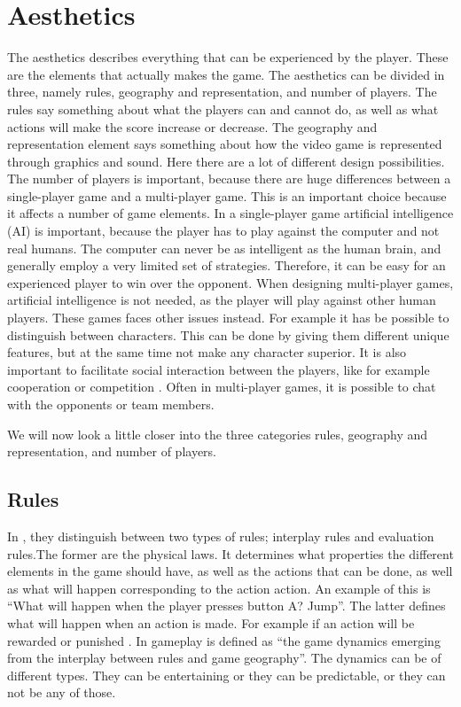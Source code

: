 \section{Aesthetics}
The aesthetics describes everything that can be experienced by the player. These are the elements that actually makes the game. The aesthetics can be divided in three, namely rules, geography and representation, and number of players. The rules say something about what the players can and cannot do, as well as what actions will make the score increase or decrease. The geography and representation element says something about how the video game is represented through graphics and sound. Here there are a lot of different design possibilities. The number of players is important, because there are huge differences between a single-player game and a multi-player game. This is an important choice because it affects a number of game elements. In a single-player game artificial intelligence (AI) is important, because the player has to play against the computer and not real humans. The computer can never be as intelligent as the human brain, and generally employ a very limited set of strategies. Therefore, it can be easy for an experienced player to win over the opponent. When designing multi-player games, artificial intelligence is not needed, as the player will play against other human players. These games faces other issues instead. For example it has be possible to distinguish between characters. This can be done by giving them different unique features, but at the same time not make any character superior. It is also important to facilitate social interaction between the players, like for example cooperation or competition \cite{understandingvg}. Often in multi-player games, it is possible to chat with the opponents or team members.

We will now look a little closer into the three categories rules, geography and representation, and number of players.

\subsection{Rules}
In \cite{understandingvg}, they distinguish between two types of rules; interplay rules and evaluation rules.The former are the physical laws. It determines what properties the different elements in the game should have, as well as the actions that can be done, as well as what will happen corresponding to the action action. An example of this is “What will happen when the player presses button A? Jump”. The latter defines what will happen when an action is made. For example if an action will be rewarded or punished \cite{understandingvg}. In \cite{understandingvg} gameplay is defined as “the game dynamics emerging from the interplay between rules and game geography”. The dynamics can be of different types. They can be entertaining or they can be predictable, or they can not be any of those. 

